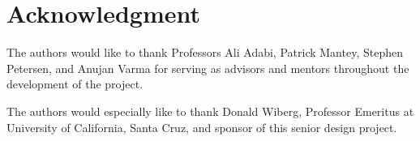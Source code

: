 \documentclass[journal,compsoc]{IEEEtran}
\begin{document}
\section*{Acknowledgment}

The authors would like to thank Professors Ali Adabi, Patrick Mantey, Stephen Petersen, and Anujan Varma for serving as advisors and mentors throughout the development of the project.

The authors would especially like to thank Donald Wiberg, Professor Emeritus at University of California, Santa Cruz, and sponsor of this senior design project.


\ifCLASSOPTIONcaptionsoff
  \newpage
\fi





%
%
%

%
\end{document}
